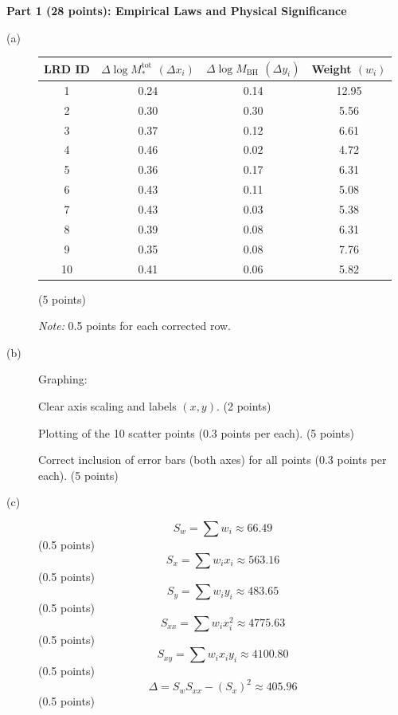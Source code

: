 \medskip\noindent\textbf{Part 1 (28 points): Empirical Laws and Physical Significance}

\begin{description}
\item[(a)]
  \begin{center}
  \begin{tabular}{cccc}
  \toprule
  LRD ID & $\Delta\log M_*^{\mathrm{tot}}$ $(\Delta x_i)$
         & $\Delta\log M_{\mathrm{BH}}$ $(\Delta y_i)$ & Weight $(w_i)$ \\
  \midrule
  1  & 0.24 & 0.14 & 12.95 \\
  2  & 0.30 & 0.30 & 5.56 \\
  3  & 0.37 & 0.12 & 6.61 \\
  4  & 0.46 & 0.02 & 4.72 \\
  5  & 0.36 & 0.17 & 6.31 \\
  6  & 0.43 & 0.11 & 5.08 \\
  7  & 0.43 & 0.03 & 5.38 \\
  8  & 0.39 & 0.08 & 6.31 \\
  9  & 0.35 & 0.08 & 7.76 \\
  10 & 0.41 & 0.06 & 5.82 \\
  \bottomrule
  \end{tabular}
  \end{center}
  \hfill(5 points)

  \textit{Note:} 0.5 points for each corrected row.

\item[(b)] Graphing:

  Clear axis scaling and labels $(x, y)$. \hfill(2 points)

  Plotting of the 10 scatter points (0.3 points per each). \hfill(5 points)

  Correct inclusion of error bars (both axes) for all points (0.3 points per
  each). \hfill(5 points)


\item[(c)]
  \[ S_w = \sum w_i \approx 66.49 \]
  \hfill(0.5 points)
  \[ S_x = \sum w_i x_i \approx 563.16 \]
  \hfill(0.5 points)
  \[ S_y = \sum w_i y_i \approx 483.65 \]
  \hfill(0.5 points)
  \[ S_{xx} = \sum w_i x_i^2 \approx 4775.63 \]
  \hfill(0.5 points)
  \[ S_{xy} = \sum w_i x_i y_i \approx 4100.80 \]
  \hfill(0.5 points)
  \[ \Delta = S_w S_{xx} - (S_x)^2 \approx 405.96 \]
  \hfill(0.5 points)


\end{description}
